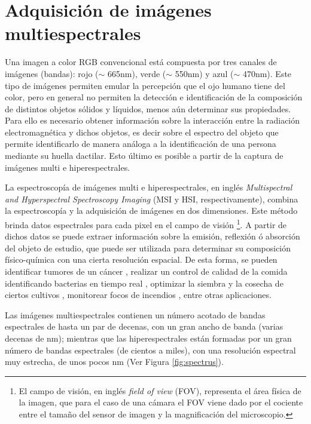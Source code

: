 \singlespacing
\section{Adquisición de imágenes multiespectrales}
\label{sec:motivacion}


\hspace{0.5cm}Una imagen a color RGB convencional está compuesta por tres 
canales de 
imágenes (bandas): rojo 
($\sim$ 665nm), verde ($\sim$ 550nm) y azul ($\sim$ 470nm). Este tipo de 
imágenes permiten emular la percepción que el ojo humano tiene del color, pero 
en general no permiten la detección e identificación de la composición de distintos objetos 
sólidos y 
líquidos, menos 
aún determinar sus propiedades. Para ello 
es necesario obtener información sobre la interacción entre la radiación electromagnética y dichos objetos, es decir sobre el espectro del objeto que permite identificarlo de manera análoga a la identificación de una persona mediante su huella dactilar. Esto último es posible a partir de la captura de imágenes multi e hiperespectrales.

La espectroscopía de imágenes multi e hiperespectrales, en inglés \textit{Multispectral and Hyperspectral Spectroscopy
Imaging} (MSI y HSI, respectivamente), combina la espectroscopía y la adquisición de imágenes en dos dimensiones.
Este método brinda datos espectrales para cada pixel en el campo de visión \footnote{El campo de visión, en inglés \textit{field of view} (FOV), representa el área física de la imagen, que para el caso de una cámara el FOV viene dado por el cociente entre el tamaño del sensor de imagen y la magnificación del microscopio.}. A partir de
dichos datos se puede extraer información sobre la emisión, reflexión ó absorción del objeto de estudio, que puede ser utilizada para determinar su composición físico-química con una cierta
resolución espacial. De esta forma, se pueden identificar tumores de un cáncer \cite{canc}, realizar un
control de calidad de la comida identificando bacterias en tiempo real \cite{food}, optimizar la siembra y la cosecha de ciertos cultivos \cite{cultiv}, monitorear focos de incendios \cite{fire}, entre otras
aplicaciones.

Las imágenes multiespectrales contienen un número acotado de bandas espectrales 
de hasta un par de decenas, con un gran ancho de banda (varias decenas de nm); 
mientras que las hiperespectrales están formadas por un gran número de bandas 
espectrales (de cientos a miles), con una resolución espectral muy estrecha, de 
unos pocos nm (Ver Figura \ref{fig:spectrus}).


